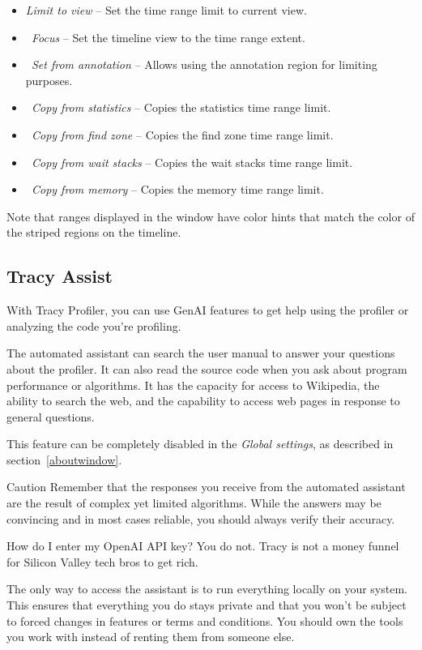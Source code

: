 \documentclass[hidelinks,titlepage,a4paper,twoside]{article}
\begin{document}
\begin{itemize}
\item \emph{Limit to view} -- Set the time range limit to current view.
\item \emph{\faMicroscope{}~Focus} -- Set the timeline view to the time range extent.
\item \emph{\faStickyNote{}~Set from annotation} -- Allows using the annotation region for limiting purposes.
\item \emph{\faSortAmountUp{}~Copy from statistics} -- Copies the statistics time range limit.
\item \emph{\faSearch{}~Copy from find zone} -- Copies the find zone time range limit.
\item \emph{\faHourglassHalf{}~Copy from wait stacks} -- Copies the wait stacks time range limit.
\item \emph{\faMemory{}~Copy from memory} -- Copies the memory time range limit.
\end{itemize}

Note that ranges displayed in the window have color hints that match the color of the striped regions on the timeline.

\subsection{Tracy Assist}
\label{tracyassist}

With Tracy Profiler, you can use GenAI features to get help using the profiler or analyzing the code you're profiling.

The automated assistant can search the user manual to answer your questions about the profiler. It can also read the source code when you ask about program performance or algorithms. It has the capacity for access to Wikipedia, the ability to search the web, and the capability to access web pages in response to general questions.

This feature can be completely disabled in the \emph{Global settings}, as described in section~\ref{aboutwindow}.

\begin{bclogo}[
noborder=true,
couleur=black!5,
logo=\bcattention
]{Caution}
Remember that the responses you receive from the automated assistant are the result of complex yet limited algorithms. While the answers may be convincing and in most cases reliable, you should always verify their accuracy.
\end{bclogo}

\begin{bclogo}[
noborder=true,
couleur=black!5,
logo=\bcquestion
]{How do I enter my OpenAI API key?}
You do not. Tracy is not a money funnel for Silicon Valley tech bros to get rich.

The only way to access the assistant is to run everything locally on your system. This ensures that everything you do stays private and that you won't be subject to forced changes in features or terms and conditions. You should own the tools you work with instead of renting them from someone else.
\end{bclogo}
\end{document}
